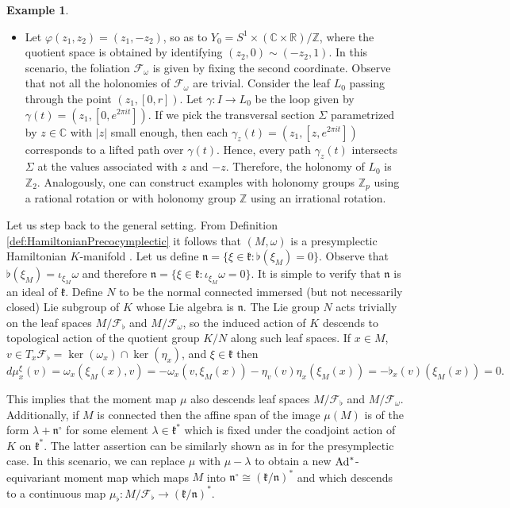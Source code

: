 \documentclass[
  a4paper, 
  reqno, 
  oneside, 
  12pt
]{amsart}
\theoremstyle{definition}
\newtheorem{example}[theorem]{Example}
\theoremstyle{remark}
\begin{document}
\begin{example}
\begin{itemize}
		\item Let $\varphi(z_1, z_2)=(z_1,-z_2)$, so as to $Y_0=S^1\times (\mathbb{C}\times \mathbb{R})/\mathbb{Z}$, where the quotient space is obtained by identifying $(z_2,0)\sim (-z_2,1)$. In this scenario, the foliation $\mathcal{F}_\omega$ is given by fixing the second coordinate. Observe that not all the holonomies of $\mathcal{F}_\omega$ are trivial. Consider the leaf $L_{0}$ passing through the point $(z_1,[0,r])$. Let $\gamma:I\to L_0$ be the loop given by $\gamma(t)=(z_1,[0,e^{2\pi i t}])$. If we pick the transversal section $\Sigma$ parametrized by  $z\in \mathbb{C}$ with $\vert z\vert$ small enough, then each $\gamma_{z}(t)=(z_1,[z,e^{2\pi i t}])$ corresponds to a lifted path over $\gamma(t)$. Hence, every path $\gamma_{z}(t)$ intersects $\Sigma$ at the values associated with $z$ and $-z$. Therefore, the holonomy of $L_0$ is $\mathbb{Z}_2$. Analogously, one can construct examples with holonomy groups $\mathbb{Z}_p$ using a rational rotation or with holonomy group $\mathbb{Z}$ using an irrational rotation.
	\end{itemize}	
\end{example}

Let us step back to the general setting. From Definition \ref{def:HamiltonianPrecocymplectic} it follows that $(M,\omega)$ is a presymplectic Hamiltonian $K$-manifold \cite{LinSjamaar}. Let us define $\mathfrak{n}=\lbrace \xi\in \mathfrak{k}: \flat(\xi_M)=0\rbrace$. Observe that $\flat(\xi_M)=\iota_{\xi_M}\omega$ and therefore $\mathfrak{n}=\lbrace \xi\in \mathfrak{k}: \iota_{\xi_M}\omega=0\rbrace$. It is simple to verify that $\mathfrak{n}$ is an ideal of $\mathfrak{k}$. Define $N$ to be the normal connected immersed (but not necessarily closed) Lie subgroup of $K$ whose Lie algebra is $\mathfrak{n}$. The Lie group $N$ acts trivially on the leaf spaces $M/\mathcal{F}_\flat$ and $M/\mathcal{F}_\omega$, so the induced action of $K$ descends to topological action of the quotient group $K/N$ along such leaf spaces. If $x\in M$, $v\in T_x \mathcal{F}_\flat=\ker(\omega_x)\cap \ker(\eta_x)$, and $\xi\in \mathfrak{k}$ then
$$d\mu^\xi_x(v)=\omega_x(\xi_M(x),v)=-\omega_x(v,\xi_M(x))-\eta_v(v)\eta_x(\xi_M(x))=-\flat_x(v)(\xi_{M}(x))=0.$$

This implies that the moment map $\mu$ also descends leaf spaces $M/\mathcal{F}_\flat$ and $M/\mathcal{F}_\omega$. Additionally, if $M$ is connected then the affine span of the image $\mu(M)$ is of the form
$\lambda+\mathfrak{n}^\circ$ for some element $\lambda\in \mathfrak{k}^\ast$ which is fixed under the coadjoint action of $K$ on $\mathfrak{k}^\ast$. The latter assertion can be similarly shown as in \cite[Prop. 2.9.1]{LinSjamaar} for the presymplectic case. In this scenario, we can replace $\mu$ with $\mu-\lambda$ to obtain a new
$\textnormal{Ad}^\ast$-equivariant moment map which maps $M$ into $\mathfrak{n}^\circ\cong (\mathfrak{k}/\mathfrak{n})^\ast$ and which
descends to a continuous map $\mu_\flat: M/\mathcal{F}_\flat\to (\mathfrak{k}/\mathfrak{n})^\ast$. 
\end{document}
